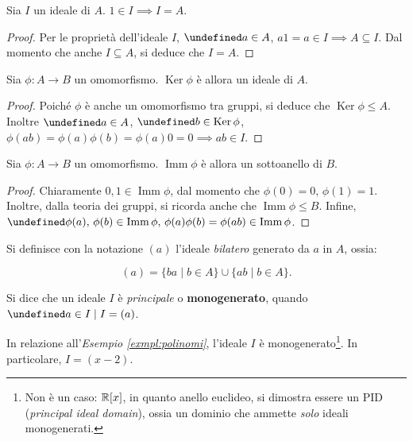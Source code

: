 \documentclass[a4paper]{article}
\DeclareMathOperator{\Ker}{Ker}
\DeclareMathOperator{\Imm}{Imm}
\let\oldforall\forall
\let\forall\undefined
\DeclareMathOperator{\forall}{\oldforall}
\let\oldexists\exists
\let\exists\undefined
\DeclareMathOperator{\exists}{\oldexists}
\begin{document}
\begin{proposition}
    Sia $I$ un ideale di $A$. $1 \in I \implies I = A$.
\end{proposition}

\begin{proof}
    Per le proprietà dell'ideale $I$, $\forall a \in A$, $a1 = a \in I \implies
        A \subseteq I$. Dal momento che anche $I \subseteq A$, si deduce che $I = A$.
\end{proof}

\begin{proposition}
    Sia $\phi : A \to B$ un omomorfismo. $\Ker \phi$ è allora un ideale di $A$.
\end{proposition}

\begin{proof}
    Poiché $\phi$ è anche un omomorfismo tra gruppi, si deduce che $\Ker \phi \leq A$.
    Inoltre $\forall a \in A$, $\forall b \in \Ker \phi$, $\phi(ab)=\phi(a)\phi(b)=\phi(a)0=0 \implies ab \in I$.
\end{proof}

\begin{proposition}
    Sia $\phi : A \to B$ un omomorfismo. $\Imm \phi$ è allora un sottoanello di $B$.
\end{proposition}

\begin{proof}
    Chiaramente $0, 1 \in \Imm \phi$, dal momento che $\phi(0) = 0,\, \phi(1)=1$. Inoltre, dalla teoria dei gruppi, si ricorda anche che $\Imm \phi \leq B$.
    Infine, $\forall \phi(a),\, \phi(b) \in \Imm \phi, \, \phi(a)\phi(b) = \phi(ab) \in \Imm \phi$.
\end{proof}

\begin{definition}
    Si definisce con la notazione $(a)$ l'ideale \textit{bilatero} generato da $a$ in $A$, ossia:

    \[(a)=\{ba \mid b \in A\} \cup \{ab \mid b \in A\}.\]
\end{definition}

\begin{definition}
    Si dice che un ideale $I$ è \textit{principale} o \textbf{monogenerato}, quando $\exists a \in I \mid I = (a)$.
\end{definition}

\begin{example}
    In relazione all'\textit{Esempio \ref{exmpl:polinomi}}, l'ideale $I$ è
    monogenerato\footnote{Non è un caso: $\mathbb{R}[x]$, in quanto anello euclideo, si dimostra essere un PID (\textit{principal ideal domain}), ossia un dominio che ammette \textit{solo} ideali monogenerati.}. In particolare, $I=(x-2)$.
\end{example}
\end{document}
